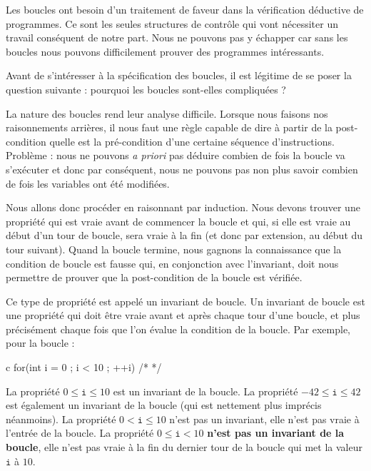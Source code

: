 Les boucles ont besoin d'un traitement de faveur dans la vérification déductive
de programmes. Ce sont les seules structures de contrôle qui vont nécessiter un
travail conséquent de notre part. Nous ne pouvons pas y échapper car sans les 
boucles nous pouvons difficilement prouver des programmes intéressants.



Avant de s'intéresser à la spécification des boucles, il est légitime de se 
poser la question suivante : pourquoi les boucles sont-elles compliquées ?



\label{l3:statements-loops-invariant}


La nature des boucles rend leur analyse difficile. Lorsque nous faisons nos 
raisonnements arrières, il nous faut une règle capable de dire à partir de la
post-condition quelle est la pré-condition d'une certaine séquence 
d'instructions. Problème : nous ne pouvons \textit{a priori} pas déduire combien de 
fois la boucle va s'exécuter et donc par conséquent, nous ne pouvons pas non 
plus savoir combien de fois les variables ont été modifiées.



Nous allons donc procéder en raisonnant par induction. Nous devons trouver une
propriété qui est vraie avant de commencer la boucle et qui, si elle est vraie
au début d'un tour de boucle, sera vraie à la fin (et donc par extension, au 
début du tour suivant). Quand la boucle termine, nous gagnons la connaissance 
que la condition de boucle est fausse qui, en conjonction avec l'invariant,
doit nous permettre de prouver que la post-condition de la boucle est vérifiée.



Ce type de propriété est appelé un invariant de boucle. Un invariant de boucle
est une propriété qui doit être vraie avant et après chaque tour d'une boucle,
et plus précisément chaque fois que l'on évalue la condition de la boucle.
Par exemple, pour la boucle :



\begin{CodeBlock}{c}
for(int i = 0 ; i < 10 ; ++i){ /* */ }
\end{CodeBlock}



La propriété $0 \leq \texttt{i} \leq 10$ est un invariant de la boucle. La 
propriété  $-42 \leq \texttt{i} \leq 42$ est également un invariant de la boucle
(qui est nettement plus imprécis néanmoins). La propriété $0 < \texttt{i} \leq 10$
n'est pas un invariant, elle n'est pas vraie à l'entrée de la boucle. La propriété
$0 \leq \texttt{i} < 10$ \textbf{n'est pas un invariant de la boucle}, elle n'est
pas vraie à la fin du dernier tour de la boucle qui met la valeur $\texttt{i}$ à 
$10$.



